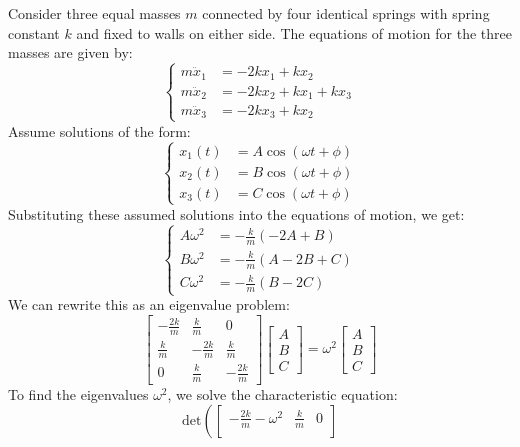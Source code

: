 \documentclass[11pt]{report}
\begin{document}
\begin{example}
    Consider three equal masses \( m \) connected by four identical springs with spring constant \( k \) and fixed to walls on either side. The equations of motion for the three masses are given by:
    $$
        \begin{cases}
            m\ddot{x}_1 &= -2k x_1 + k x_2 \\
            m\ddot{x}_2 &= -2k x_2 + k x_1 + k x_3 \\
            m\ddot{x}_3 &= -2k x_3 + k x_2
        \end{cases}
    $$
    Assume solutions of the form:
    $$        
    \begin{cases}
            x_1(t) &= A \cos(\omega t + \phi) \\
            x_2(t) &= B \cos(\omega t + \phi) \\
            x_3(t) &= C \cos(\omega t + \phi)
        \end{cases}
    $$
    Substituting these assumed solutions into the equations of motion, we get:
    $$      
        \begin{cases}
            A \omega^2 &= -\frac{k}{m}(-2A + B) \\
            B \omega^2 &= -\frac{k}{m}(A - 2B + C) \\
            C \omega^2 &= -\frac{k}{m}(B - 2C)
        \end{cases}
    $$
    We can rewrite this as an eigenvalue problem:
    $$
        \begin{bmatrix}
            -\frac{2k}{m} & \frac{k}{m} & 0 \\
            \frac{k}{m} & -\frac{2k}{m} & \frac{k}{m} \\
            0 & \frac{k}{m} & -\frac{2k}{m}
        \end{bmatrix}
        \begin{bmatrix}
            A \\ B \\ C
        \end{bmatrix}
        = \omega^2
        \begin{bmatrix}
            A \\ B \\ C
        \end{bmatrix}
    $$
    To find the eigenvalues \( \omega^2 \), we solve the characteristic equation:
    $$
        \text{det}\left(\begin{bmatrix} 
            -\frac{2k}{m} - \omega^2 & \frac{k}{m} & 0 \\

\end{bmatrix}$$
\end{example}
\end{document}
